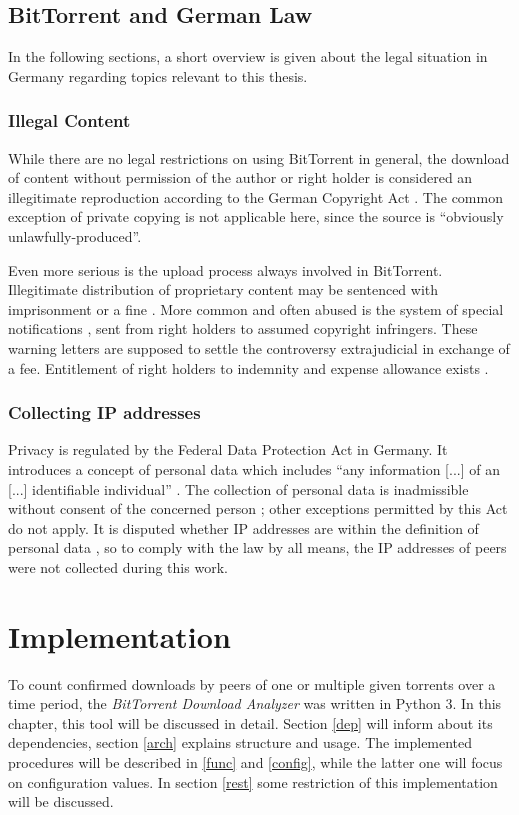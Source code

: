 \documentclass[10pt, a4paper, twoside=false, headsepline]{scrbook}
\renewcommand{\_}{\origunderscore\allowbreak}
\begin{document}
\section{BitTorrent and German Law}
\label{law}
In the following sections, a short overview is given about the legal situation in Germany regarding topics relevant to this thesis.

\subsection{Illegal Content}
While there are no legal restrictions on using BitTorrent in general, the download of content without permission of the author or right holder is considered an illegitimate reproduction according to the German Copyright Act \cite[art.~15\,(1),~16]{urhg}. The common exception of private copying \cite[art.~53]{urhg} is not applicable here, since the source is ``obviously unlawfully-produced''.

Even more serious is the upload process always involved in BitTorrent. Illegitimate distribution of proprietary content may be sentenced with imprisonment or a fine \cite[art.~106]{urhg}. More common and often abused \cite{abmahnung} is the system of special notifications \cite[art.~97a]{urhg}, sent from right holders to assumed copyright infringers. These warning letters are supposed to settle the controversy extrajudicial in exchange of a fee. Entitlement of right holders to indemnity and expense allowance exists \cite[art.~97]{urhg}.

\subsection{Collecting IP addresses}
Privacy is regulated by the Federal Data Protection Act \cite{bdsg} in Germany. It introduces a concept of personal data which includes ``any information [...] of an [...] identifiable individual'' \cite[sec.~3\,(1)]{bdsg}. The collection of personal data is inadmissible without consent of the concerned person \cite[sec.~4]{bdsg}; other exceptions permitted by this Act do not apply. It is disputed whether IP addresses are within the definition of personal data \cite{ip}, so to comply with the law by all means, the IP addresses of peers were not collected during this work.

\chapter{Implementation}
\label{impl}
To count confirmed downloads by peers of one or multiple given torrents over a time period, the \emph{BitTorrent Download Analyzer} was written in Python 3. In this chapter, this tool will be discussed in detail. Section \ref{dep} will inform about its dependencies, section \ref{arch} explains structure and usage. The implemented procedures will be described in \ref{func} and \ref{config}, while the latter one will focus on configuration values. In section \ref{rest} some restriction of this implementation will be discussed.
\end{document}
